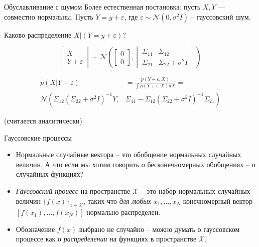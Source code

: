 \documentclass[fullscreen=true, bookmarks=true, hyperref={pdfencoding=unicode}]{beamer}
\begin{document}
\begin{frame}{Обуславливание с шумом}
    Более естественная постановка: пусть $X, Y$ --- совместно нормальны. Пусть $Y = y + \varepsilon$, где $\varepsilon \sim \mathcal{N}(0, \sigma^2I)$ -- гауссовский шум.

    \pause
    Каково распределение $X | (Y = y + \varepsilon)$?

    $$ \begin{bmatrix} X \\ Y + \varepsilon \end{bmatrix} \sim \mathcal{N}\left( \begin{bmatrix} 0 \\ 0\end{bmatrix}, \begin{bmatrix} \Sigma_{11} & \Sigma_{12} \\ \Sigma_{21} & \Sigma_{22} + \sigma^2I \end{bmatrix} \right) $$

    \pause
    \begin{align*}
    p(X | Y + \varepsilon) &= \frac{p(Y + \varepsilon, X)}{\int p(Y + \varepsilon, X) dX} = \\
    \mathcal{N}\left( \Sigma_{12} (\Sigma_{22}+\sigma^2I)^{-1} Y,\right. & \left. \Sigma_{11} - \Sigma_{12} (\Sigma_{22}+\sigma^2I)^{-1} \Sigma_{21} \right)
    \end{align*}
    \begin{center}
      (считается аналитически)
    \end{center}

\end{frame}

\begin{frame}{Гауссовские процессы}
   \begin{itemize}
    \item<1-> Нормальные случайные вектора -- это обобщение нормальных случайных величин. А что если мы хотим говорить о бесконечномерных обобщениях -- о случайных функциях?

    \item<2-> \textit{Гауссовский процесс} на пространстве $\mathcal{X}$ -- это набор нормальных случайных величин $ \{ f(x) \}_{x \in \mathcal{X}} $, таких что \textit{для любых} $x_1, \ldots, x_N $ конечномерный вектор $[ f(x_1), \ldots, f(x_N) ]$ нормально распределен.

    \item<3-> Обозначение $f(x)$ выбрано не случайно -- можно думать о гауссовском процессе как о \textit{распределении} на функциях в пространстве $\mathcal{X}$.
    \end{itemize}
\end{frame}
\end{document}
